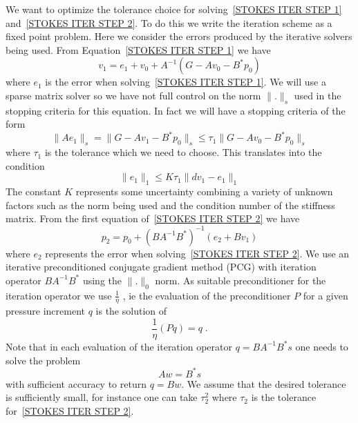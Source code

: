 We want to optimize the tolerance choice for solving~\ref{STOKES ITER STEP 1}
and~\ref{STOKES ITER STEP 2}. To do this we write the iteration scheme as a fixed point problem. Here
we consider the errors produced by the iterative solvers being used. 
From Equation~\ref{STOKES ITER STEP 1} we have 
\begin{equation} \label{STOKES total V1}
v_{1} = e_{1} + v_{0} + A^{-1} ( G - Av_{0} - B^{*} p_{0} ) 
\end{equation}
where $ e_{1}$ is the error when solving~\ref{STOKES ITER STEP 1}.  
We will use a sparse matrix solver so we have not full control on the norm $\|.\|_{s}$ used in the stopping criteria for this equation. In fact we will have a stopping criteria of the form 
\begin{equation} 
\| A e_{1} \|_{s}  = \| G - A v_{1} - B^{*} p_{0} \|_{s} \le \tau_{1} \| G - A v_{0} - B^{*} p_{0} \|_{s} 
\end{equation}
where $\tau_{1}$ is the tolerance which we need to choose. This translates into the condition
\begin{equation} 
\| e_{1} \|_{1} \le K \tau_{1} \| dv_{1} - e_{1} \|_{1} 
\end{equation}
The constant $K$ represents some uncertainty combining a variety of unknown factors such as the 
norm being used and the condition number of the stiffness matrix.  
From the first equation of~\ref{STOKES ITER STEP 2} we have
\begin{equation}\label{STOKES total P2}
p_{2} =  p_{0} + (B A^{-1} B^{*})^{-1} (e_{2} + Bv_{1} )
\end{equation}
where $e_{2}$ represents the error when solving~\ref{STOKES ITER STEP 2}.
We use an iterative preconditioned conjugate gradient method (PCG)  with iteration 
operator $B A^{-1} B^{*}$ using the $\|.\|_{0}$ norm. As suitable preconditioner  for the iteration
operator we use $\frac{1}{\eta}$ \cite{ELMAN}, ie 
the evaluation of the preconditioner $P$ for a given pressure increment $q$ is the solution of
\begin{equation} \label{STOKES P PREC}
\frac{1}{\eta} (Pq) = q \; . 
\end{equation}
Note that in each evaluation of the iteration operator $q=B A^{-1} B^{*} s$ one needs to solve
the problem
\begin{equation} \label{STOKES P OPERATOR}
A w = B^{*} s 
\end{equation}
with sufficient accuracy to return $q=Bw$. We assume that the desired tolerance is 
sufficiently small, for instance one can take $\tau_{2}^2$ 
where $\tau_{2}$ is the tolerance for~\ref{STOKES ITER STEP 2}.

